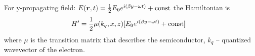 For y-propagating field: $E(\mbox{\boldmath $r$}, t) = \frac{1}{2} E_0 e^{i (\beta y - \omega t)} + \text{const}$ the Hamiltonian is
\begin{equation*}
	H' = \frac{1}{2} \mu(k_q,x,z) [E_0 e^{i (\beta y - \omega t)} + \text{const}]
\end{equation*}
where $\mu$ is the transition matrix that describes the semiconductor, $k_q$ -- quantized wavevector of the electron.